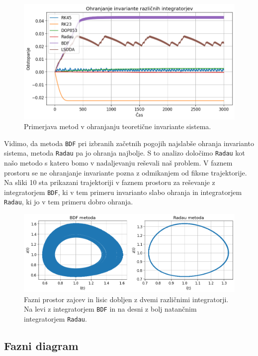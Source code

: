 \documentclass[slovene,11pt,a4paper]{article}
\begin{document}
\begin{figure}[h!]
\centering
\includegraphics[width=13.5cm]{zajci1.png}
\caption{Primerjava metod v ohranjanju teoretične invariante sistema.}
\end{figure}

Vidimo, da metoda \texttt{BDF} pri izbranih začetnih pogojih najslabše ohranja invarianto sistema, metoda \texttt{Radau} pa jo ohranja najbolje. S to analizo določimo \texttt{Radau} kot našo metodo s katero bomo v nadaljevanju reševali naš problem. V faznem prostoru se ne ohranjanje invariante pozna z odmikanjem od fiksne trajektorije. Na sliki 10 sta prikazani trajektoriji v faznem prostoru za reševanje z integratorjem \texttt{BDF}, ki v tem primeru invarianto slabo ohranja in integratorjem \texttt{Radau}, ki jo v tem primeru dobro ohranja.

\begin{figure}[h!]
\centering
\includegraphics[width=13.5cm]{zajci2.png}
\caption{Fazni prostor zajcev in lisic dobljen z dvemi različnimi integratorji. Na levi z integratorjem \texttt{BDF} in na desni z bolj natančnim integratorjem \texttt{Radau}.}
\end{figure}

\subsection{Fazni diagram}
\end{document}
